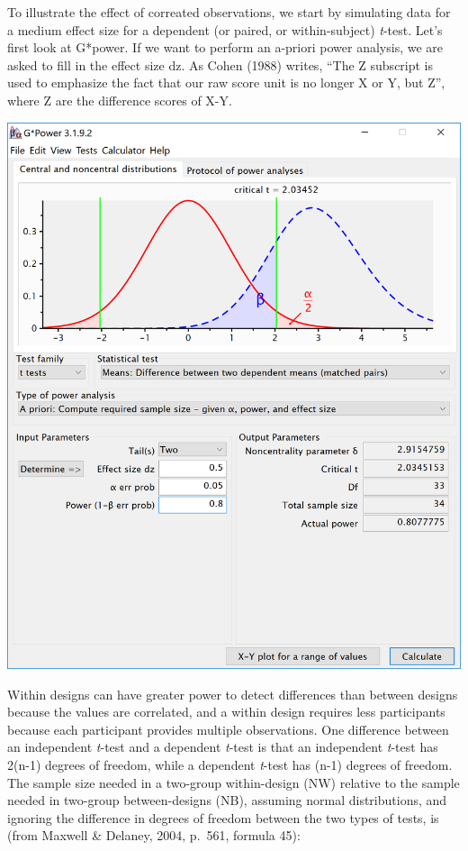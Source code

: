 \documentclass[]{book}
\begin{document}
To illustrate the effect of correated observations, we start by simulating data for a medium effect size for a dependent (or paired, or within-subject) \emph{t}-test. Let's first look at G*power. If we want to perform an a-priori power analysis, we are asked to fill in the effect size dz. As Cohen (1988) writes, ``The Z subscript is used to emphasize the fact that our raw score unit is no longer X or Y, but Z'', where Z are the difference scores of X-Y.

\includegraphics{screenshots/gpower_9.png}

Within designs can have greater power to detect differences than between designs because the values are correlated, and a within design requires less participants because each participant provides multiple observations. One difference between an independent \emph{t}-test and a dependent \emph{t}-test is that an independent \emph{t}-test has 2(n-1) degrees of freedom, while a dependent \emph{t}-test has (n-1) degrees of freedom. The sample size needed in a two-group within-design (NW) relative to the sample needed in two-group between-designs (NB), assuming normal distributions, and ignoring the difference in degrees of freedom between the two types of tests, is (from Maxwell \& Delaney, 2004, p.~561, formula 45):
\end{document}
